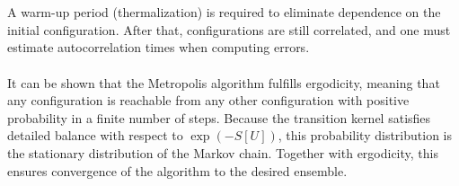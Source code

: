 \\\\
A warm-up period (thermalization) is required to eliminate dependence on the initial configuration. After that, configurations are still correlated, and one must estimate autocorrelation times when computing errors.
\\\\
It can be shown that the Metropolis algorithm fulfills ergodicity, meaning that any configuration is reachable from any other configuration with positive probability in a finite number of steps. Because the transition kernel satisfies detailed balance with respect to $\exp (-S[U])$, this probability distribution is the stationary distribution of the Markov chain. Together with ergodicity, this ensures convergence of the algorithm to the desired ensemble. \cite{GattingerLang}